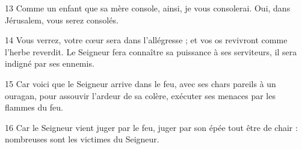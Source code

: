 
13 Comme un enfant que sa mère console, ainsi, je vous consolerai. Oui, dans Jérusalem, vous serez consolés.

14 Vous verrez, votre cœur sera dans l’allégresse ; et vos os revivront comme l’herbe reverdit. Le Seigneur fera connaître sa puissance à ses serviteurs, il sera indigné par ses ennemis.

15 Car voici que le Seigneur arrive dans le feu, avec ses chars pareils à un ouragan, pour assouvir l’ardeur de sa colère, exécuter ses menaces par les flammes du feu.

16 Car le Seigneur vient juger par le feu, juger par son épée tout être de chair : nombreuses sont les victimes du Seigneur.
